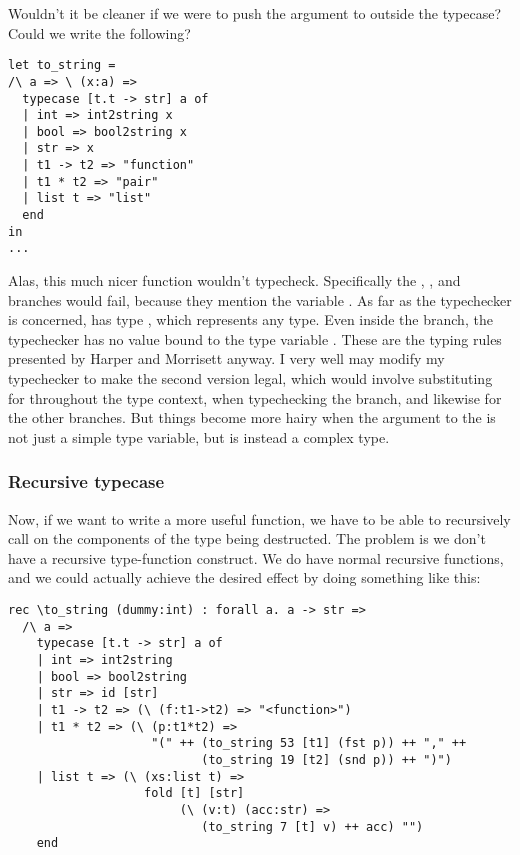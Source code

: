 \message{ !name(report.tex)}\documentclass[pageno]{jpaper}
\begin{document}
{{{%

Wouldn't it be cleaner if we were to push the argument to  outside the typecase?
Could we write the following?

\begin{lstlisting}[mathescape]
let to_string = 
/\ a => \ (x:a) =>
  typecase [t.t -> str] a of
  | int => int2string x
  | bool => bool2string x
  | str => x
  | t1 -> t2 => "function"
  | t1 * t2 => "pair"
  | list t => "list"
  end
in
...
\end{lstlisting}

Alas, this much nicer function wouldn't typecheck. Specifically the , ,
and  branches would fail, because they mention the variable . As far as the typechecker is concerned,  has type , which represents any type. Even inside the  branch,
the typechecker has no value bound to the type variable . These are the typing rules presented by
Harper and Morrisett anyway. I very well may modify my typechecker to make the second version legal,
which would involve substituting  for  throughout the type context, when typechecking
the  branch, and likewise for the other branches. But things become more hairy when
the argument to the  is not just a simple type variable, but is instead a complex
type. 

\subsubsection{Recursive typecase}

Now, if we want to write a more useful  function, we have to be able to recursively call
 on the components of the type being destructed.
The problem is we don't have a recursive type-function construct. We do have normal recursive functions,
and we could actually achieve the desired effect by doing something like this:

\begin{lstlisting}[mathescape]
rec \to_string (dummy:int) : forall a. a -> str =>
  /\ a =>
    typecase [t.t -> str] a of
    | int => int2string
    | bool => bool2string
    | str => id [str]
    | t1 -> t2 => (\ (f:t1->t2) => "<function>")
    | t1 * t2 => (\ (p:t1*t2) => 
                    "(" ++ (to_string 53 [t1] (fst p)) ++ "," ++
                           (to_string 19 [t2] (snd p)) ++ ")")
    | list t => (\ (xs:list t) =>
                   fold [t] [str] 
                        (\ (v:t) (acc:str) =>
                           (to_string 7 [t] v) ++ acc) "")
    end
\end{lstlisting}

}}}
\end{document}
